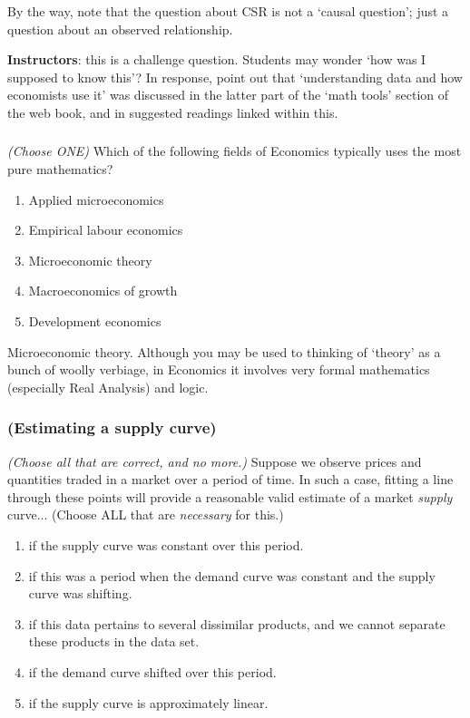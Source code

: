 \documentclass[]{article}
\begin{document}
By the way, note that the question about CSR is not a `causal question';
just a question about an observed relationship.


\textbf{Instructors}: this is a challenge question. Students may wonder
`how was I supposed to know this'? In response, point out that
`understanding data and how economists use it' was discussed in the
latter part of the `math tools' section of the web book, and in
suggested readings linked within this.


\hypertarget{section-1}{%
\subsubsection{}\label{section-1}}

\emph{(Choose ONE)} Which of the following fields of Economics typically
uses the most pure mathematics?

\begin{enumerate}
\def\labelenumi{\Alph{enumi}.}
\item
  Applied microeconomics
\item
  Empirical labour economics
\item
  Microeconomic theory
\item
  Macroeconomics of growth
\item
  Development economics
\end{enumerate}

Microeconomic theory. Although you may be used to thinking of `theory'
as a bunch of woolly verbiage, in Economics it involves very formal
mathematics (especially Real Analysis) and logic.

\hypertarget{supplycurve}{%
\subsubsection{(Estimating a supply curve)}\label{supplycurve}}

\emph{(Choose all that are correct, and no more.)} Suppose we observe
prices and quantities traded in a market over a period of time. In such
a case, fitting a line through these points will provide a reasonable
valid estimate of a market \emph{supply} curve... (Choose ALL that are
\emph{necessary} for this.)

\begin{enumerate}
\def\labelenumi{\Alph{enumi}.}
\item
  if the supply curve was constant over this period.
\item
  if this was a period when the demand curve was constant and the supply
  curve was shifting.
\item
  if this data pertains to several dissimilar products, and we cannot
  separate these products in the data set.
\item
  if the demand curve shifted over this period.
\item
  if the supply curve is approximately linear.
\end{enumerate}
\end{document}
